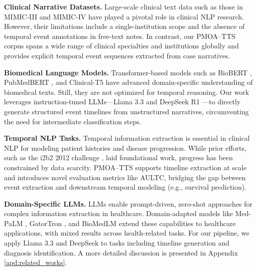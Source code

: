 \textbf{Clinical Narrative Datasets.} Large-scale clinical text data such as those in MIMIC-III \cite{johnson2016mimic} and MIMIC-IV \cite{johnson2023mimic} have played a pivotal role in clinical NLP research. However, their limitations include a single-institution scope and the absence of temporal event annotations in free-text notes. In contrast, our PMOA–TTS corpus spans a wide range of clinical specialties and institutions globally and provides explicit temporal event sequences extracted from case narratives. %

\textbf{Biomedical Language Models.} Transformer-based models such as BioBERT \cite{lee2020biobert}, PubMedBERT \cite{gu2021domain}, and Clinical-T5 \cite{lehman2023clinical} have advanced domain-specific understanding of biomedical texts. Still, they are not optimized for temporal reasoning. Our work leverages instruction-tuned LLMs—Llama 3.3 \cite{grattafiori2024llama} and DeepSeek R1 \cite{guo2025deepseek}—to directly generate structured event timelines from unstructured narratives, circumventing the need for intermediate classification steps.

\textbf{Temporal NLP Tasks.} Temporal information extraction is essential in clinical NLP for modeling patient histories and disease progression. While prior efforts, such as the i2b2 2012 challenge \cite{sun2013evaluating}, laid foundational work, progress has been constrained by data scarcity. PMOA–TTS supports timeline extraction at scale and introduces novel evaluation metrics like AULTC, bridging the gap between event extraction and downstream temporal modeling (e.g., survival prediction).

\textbf{Domain-Specific LLMs.} LLMs enable prompt-driven, zero-shot approaches for complex information extraction in healthcare.
Domain-adapted models like Med-PaLM \cite{singhal2025toward}, GatorTron \cite{yang2022gatortron}, and BioMedLM \cite{bolton2024biomedlm} extend these capabilities to healthcare applications, with mixed results across health-related tasks.
For our pipeline, we apply Llama 3.3 and DeepSeek to tasks including timeline generation and diagnosis identification. %
A more detailed discussion %
is presented in Appendix \ref{apd:related_works}.

